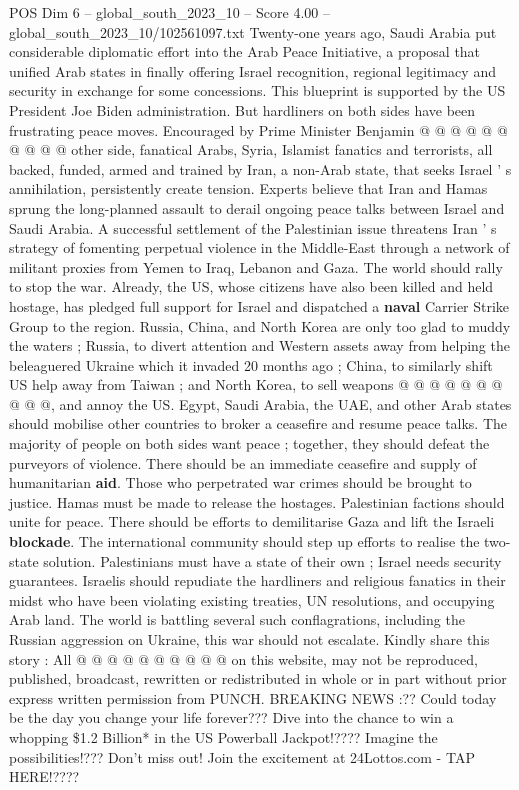 \begin{textsample}{POS Dim 6 – global\_south\_2023\_10 – Score 4.00 – global\_south\_2023\_10/102561097.txt}
Twenty-one years ago, Saudi Arabia put considerable diplomatic effort into the Arab Peace Initiative, a proposal that unified Arab states in finally offering Israel recognition, regional legitimacy and security in exchange for some concessions.
This blueprint is supported by the US President Joe Biden administration.
But hardliners on both sides have been frustrating peace moves.
Encouraged by Prime Minister Benjamin @ @ @ @ @ @ @ @ @ @ other side, fanatical Arabs, Syria, Islamist fanatics and terrorists, all backed, funded, armed and trained by Iran, a non-Arab state, that seeks Israel ' s annihilation, persistently create tension.
Experts believe that Iran and Hamas sprung the long-planned assault to derail ongoing peace talks between Israel and Saudi Arabia.
A successful settlement of the Palestinian issue threatens Iran ' s strategy of fomenting perpetual violence in the Middle-East through a network of militant proxies from Yemen to Iraq, Lebanon and Gaza.
The world should rally to stop the war.
Already, the US, whose citizens have also been killed and held hostage, has pledged full support for Israel and dispatched a \textbf{naval} Carrier Strike Group to the region.
Russia, China, and North Korea are only too glad to muddy the waters ; Russia, to divert attention and Western assets away from helping the beleaguered Ukraine which it invaded 20 months ago ; China, to similarly shift US help away from Taiwan ; and North Korea, to sell weapons @ @ @ @ @ @ @ @ @ @, and annoy the US.
Egypt, Saudi Arabia, the UAE, and other Arab states should mobilise other countries to broker a ceasefire and resume peace talks.
The majority of people on both sides want peace ; together, they should defeat the purveyors of violence.
There should be an immediate ceasefire and supply of humanitarian \textbf{aid}.
Those who perpetrated war crimes should be brought to justice.
Hamas must be made to release the hostages.
Palestinian factions should unite for peace.
There should be efforts to demilitarise Gaza and lift the Israeli \textbf{blockade}.
The international community should step up efforts to realise the two-state solution.
Palestinians must have a state of their own ; Israel needs security guarantees.
Israelis should repudiate the hardliners and religious fanatics in their midst who have been violating existing treaties, UN resolutions, and occupying Arab land.
The world is battling several such conflagrations, including the Russian aggression on Ukraine, this war should not escalate.
Kindly share this story : All @ @ @ @ @ @ @ @ @ @ on this website, may not be reproduced, published, broadcast, rewritten or redistributed in whole or in part without prior express written permission from PUNCH.
BREAKING NEWS :??
Could today be the day you change your life forever???
Dive into the chance to win a whopping \$1.2 Billion* in the US Powerball Jackpot!????
Imagine the possibilities!???
Don't miss out!
Join the excitement at 24Lottos.com - TAP HERE!????

\end{textsample}
